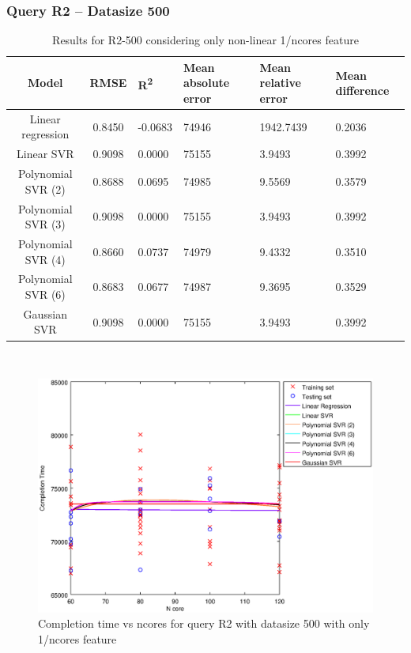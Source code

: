 \documentclass[a4paper,11pt]{article}
\begin{document}
\newpage
\subsubsection{Query R2 -- Datasize 500}
\begin{table}[H]
	\centering
	\begin{adjustbox}{center}
		\begin{tabular}{c | c M{1.2cm} M{2.5cm} M{2.5cm} M{1.8cm}}
			Model & RMSE & R\textsuperscript{2} & Mean absolute error & Mean relative error & Mean difference \tabularnewline
			\hline
			Linear regression & 0.8450 & -0.0683 &  74946 & 1942.7439 & 0.2036 \\
			Linear SVR & 0.9098 & 0.0000 &  75155 & 3.9493 & 0.3992 \\
			Polynomial SVR (2) & 0.8688 & 0.0695 &  74985 & 9.5569 & 0.3579 \\
			Polynomial SVR (3) & 0.9098 & 0.0000 &  75155 & 3.9493 & 0.3992 \\
			Polynomial SVR (4) & 0.8660 & 0.0737 &  74979 & 9.4332 & 0.3510 \\
			Polynomial SVR (6) & 0.8683 & 0.0677 &  74987 & 9.3695 & 0.3529 \\
			Gaussian SVR & 0.9098 & 0.0000 &  75155 & 3.9493 & 0.3992 \\
		\end{tabular}
	\end{adjustbox}
	\\
	\caption{Results for R2-500 considering only non-linear 1/ncores feature}
	\label{table_R2_prediction_all}
\end{table}

\begin {figure}[hbtp]
\centering
\includegraphics[width=\textwidth]{output/R2_500_ONLY_1_OVER_NCORES/plot_R2_500.eps}
\caption {Completion time vs ncores for query R2 with datasize 500 with only 1/ncores feature}
\end {figure}
\end{document}
